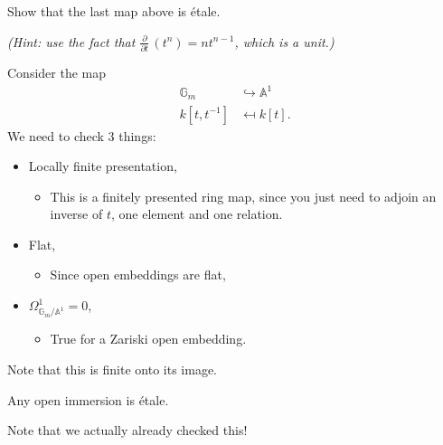 \begin{exercise}[?]

Show that the last map above is étale.

\emph{(Hint: use the fact that
\({\frac{\partial }{\partial t}\,} (t^n) = nt^{n-1}\), which is a
unit.)}

\end{exercise}

\begin{example}[?]

Consider the map
\begin{align*}  
{\mathbb{G}}_m &\hookrightarrow{\mathbb{A}}^1 \\
k[t, t^{-1}] &\mapsfrom k[t]
.\end{align*}
We need to check 3 things:

\begin{itemize}
\tightlist
\item
  Locally finite presentation,

  \begin{itemize}
  \tightlist
  \item
    This is a finitely presented ring map, since you just need to adjoin
    an inverse of \(t\), one element and one relation.
  \end{itemize}
\item
  Flat,

  \begin{itemize}
  \tightlist
  \item
    Since open embeddings are flat,
  \end{itemize}
\item
  \(\Omega^1_{{\mathbb{G}}_m / {\mathbb{A}}^1} = 0\),

  \begin{itemize}
  \tightlist
  \item
    True for a Zariski open embedding.
  \end{itemize}
\end{itemize}

Note that this is finite onto its image.

\end{example}

\begin{proposition}[?]

Any open immersion is étale.

\end{proposition}

Note that we actually already checked this!

